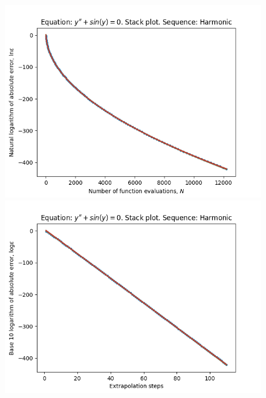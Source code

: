 \begin{figure}[H]
\centering
\begin{minipage}{0.45\textwidth}
\centering
\includegraphics[scale=0.45]{emr_plots/oscillation_hp_harmonic_stack.png}
\end{minipage}
\begin{minipage}{0.45\textwidth}
\centering
\includegraphics[scale=0.45]{emr_plots/oscillation_hp_harmonic_steps_stack.png}
\end{minipage}
\end{figure}

